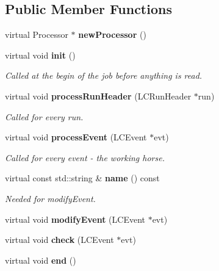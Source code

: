 \subsection*{Public Member Functions}
\begin{DoxyCompactItemize}
\item 
virtual Processor $\ast$ {\bfseries new\-Processor} ()\label{classmarlin_1_1RunInfoProcessor_ab8aa029e7fee27866206787f322b3616}

\item 
virtual void {\bf init} ()
\begin{DoxyCompactList}\small\item\em Called at the begin of the job before anything is read. \end{DoxyCompactList}\item 
virtual void {\bf process\-Run\-Header} (L\-C\-Run\-Header $\ast$run)\label{classmarlin_1_1RunInfoProcessor_a037d6642c5effd5ea57ef2d3dec2ce47}

\begin{DoxyCompactList}\small\item\em Called for every run. \end{DoxyCompactList}\item 
virtual void {\bf process\-Event} (L\-C\-Event $\ast$evt)\label{classmarlin_1_1RunInfoProcessor_a44b26122c6d673c48d5c2e0dfc5a10fd}

\begin{DoxyCompactList}\small\item\em Called for every event -\/ the working horse. \end{DoxyCompactList}\item 
virtual const std\-::string \& {\bf name} () const \label{classmarlin_1_1RunInfoProcessor_a4e0b06142a6fe83a607f8fbbfc5f3a07}

\begin{DoxyCompactList}\small\item\em Needed for modify\-Event. \end{DoxyCompactList}\item 
virtual void {\bfseries modify\-Event} (L\-C\-Event $\ast$evt)\label{classmarlin_1_1RunInfoProcessor_a87835b19afc2566d1edf358c49060243}

\item 
virtual void {\bfseries check} (L\-C\-Event $\ast$evt)\label{classmarlin_1_1RunInfoProcessor_a13101be4c139383d19a2578cac39fc21}

\item 
virtual void {\bf end} ()\label{classmarlin_1_1RunInfoProcessor_a8c82fcf3504ddc1d1cd83bd3df48b8a1}


\end{DoxyCompactItemize}
